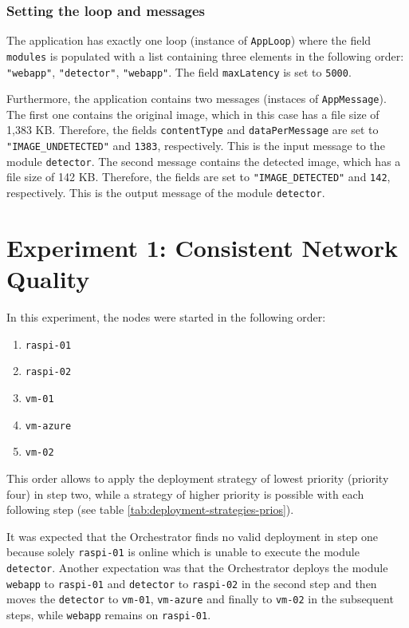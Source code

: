\subsubsection*{Setting the loop and messages}
The application has exactly one loop (instance of \texttt{AppLoop}) where the field \texttt{modules} is populated with a list containing three elements in the following order:
\texttt{"webapp"}, \texttt{"detector"}, \texttt{"webapp"}.
The field \texttt{maxLatency} is set to \texttt{5000}.

Furthermore, the application contains two messages (instaces of \texttt{AppMessage}).
The first one contains the original image, which in this case has a file size of 1,383 KB. Therefore, the fields \texttt{contentType} and \texttt{dataPerMessage} are set to \texttt{"IMAGE\_UNDETECTED"} and  \texttt{1383}, respectively. This is the input message to the module \texttt{detector}.
The second message contains the detected image, which has a file size of 142 KB. Therefore, the fields are set to \texttt{"IMAGE\_DETECTED"} and \texttt{142}, respectively. This is the output message of the module \texttt{detector}.









\section{Experiment 1: Consistent Network Quality\label{sec:eval-exp-1}}

In this experiment, the nodes were started in the following order:
\begin{enumerate}
    \item \texttt{raspi-01}
    \item \texttt{raspi-02}
    \item \texttt{vm-01}
    \item \texttt{vm-azure}
    \item \texttt{vm-02}
\end{enumerate}
This order allows to apply the deployment strategy of lowest priority (priority four) in step two, while a strategy of higher priority is possible with each following step (see table \ref{tab:deployment-strategies-prios}).

It was expected that the Orchestrator finds no valid deployment in step one because solely \texttt{raspi-01} is online which is unable to execute the module \texttt{detector}.
Another expectation was that the Orchestrator deploys the module \texttt{webapp} to \texttt{raspi-01} and \texttt{detector} to \texttt{raspi-02} in the second step and then moves the \texttt{detector} to \texttt{vm-01}, \texttt{vm-azure} and finally to \texttt{vm-02} in the subsequent steps, while \texttt{webapp} remains on \texttt{raspi-01}.

